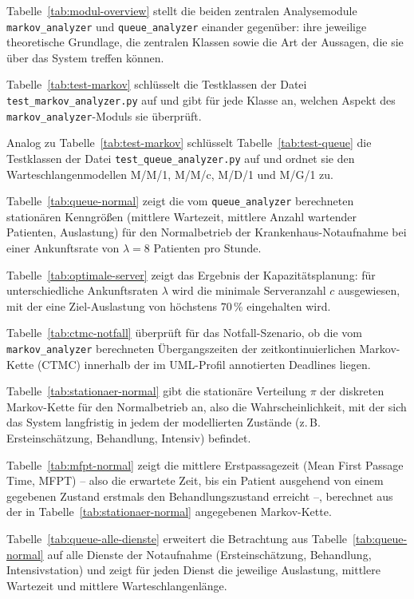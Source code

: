 ﻿\documentclass[a4paper,12pt]{report}
\theoremstyle{definition}
\begin{document}
Tabelle~\ref{tab:modul-overview} stellt die beiden zentralen Analysemodule \texttt{markov\_analyzer} und \texttt{queue\_analyzer} einander gegenüber: ihre jeweilige theoretische Grundlage, die zentralen Klassen sowie die Art der Aussagen, die sie über das System treffen können.

Tabelle~\ref{tab:test-markov} schlüsselt die Testklassen der Datei \texttt{test\_markov\_analyzer.py} auf und gibt für jede Klasse an, welchen Aspekt des \texttt{markov\_analyzer}-Moduls sie überprüft.

Analog zu Tabelle~\ref{tab:test-markov} schlüsselt Tabelle~\ref{tab:test-queue} die Testklassen der Datei \texttt{test\_queue\_analyzer.py} auf und ordnet sie den Warteschlangenmodellen M/M/1, M/M/c, M/D/1 und M/G/1 zu.

Tabelle~\ref{tab:queue-normal} zeigt die vom \texttt{queue\_analyzer} berechneten stationären Kenngrößen (mittlere Wartezeit, mittlere Anzahl wartender Patienten, Auslastung) für den Normalbetrieb der Krankenhaus-Notaufnahme bei einer Ankunftsrate von $\lambda = 8$ Patienten pro Stunde.

Tabelle~\ref{tab:optimale-server} zeigt das Ergebnis der Kapazitätsplanung: für unterschiedliche Ankunftsraten $\lambda$ wird die minimale Serveranzahl $c$ ausgewiesen, mit der eine Ziel-Auslastung von höchstens $70\,\%$ eingehalten wird.

Tabelle~\ref{tab:ctmc-notfall} überprüft für das Notfall-Szenario, ob die vom \texttt{markov\_analyzer} berechneten Übergangszeiten der zeitkontinuierlichen Markov-Kette (CTMC) innerhalb der im UML-Profil annotierten Deadlines liegen.

Tabelle~\ref{tab:stationaer-normal} gibt die stationäre Verteilung $\pi$ der diskreten Markov-Kette für den Normalbetrieb an, also die Wahrscheinlichkeit, mit der sich das System langfristig in jedem der modellierten Zustände (z.\,B. Ersteinschätzung, Behandlung, Intensiv) befindet.

Tabelle~\ref{tab:mfpt-normal} zeigt die mittlere Erstpassagezeit (Mean First Passage Time, MFPT) -- also die erwartete Zeit, bis ein Patient ausgehend von einem gegebenen Zustand erstmals den Behandlungszustand erreicht --, berechnet aus der in Tabelle~\ref{tab:stationaer-normal} angegebenen Markov-Kette.

Tabelle~\ref{tab:queue-alle-dienste} erweitert die Betrachtung aus Tabelle~\ref{tab:queue-normal} auf alle Dienste der Notaufnahme (Ersteinschätzung, Behandlung, Intensivstation) und zeigt für jeden Dienst die jeweilige Auslastung, mittlere Wartezeit und mittlere Warteschlangenlänge.
\end{document}
